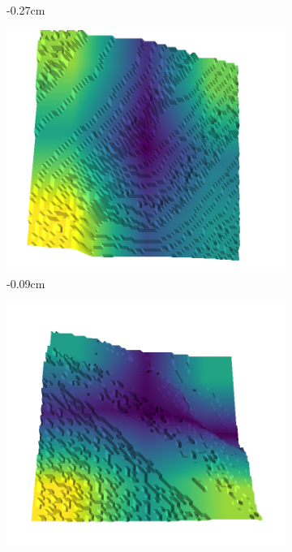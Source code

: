 \documentclass[../document.tex]{subfiles}
\begin{document}
\begin{figure}[H]
\begin{subfigure}[b]{0.242\linewidth}
    \caption{-0.27cm}
    \end{subfigure}
    \begin{subfigure}[b]{0.242\linewidth}
    \includegraphics[width=\linewidth]{../img/5/quarry/worst/-2-patch-3d-majavi-colormap-10.png}
    \caption{-0.09cm}
    \end{subfigure}
    \begin{subfigure}[b]{0.242\linewidth}
    \includegraphics[width=\linewidth]{../img/5/quarry/worst/-1-patch-3d-majavi-colormap-15.png}

\end{subfigure}
\end{figure}
\end{document}
